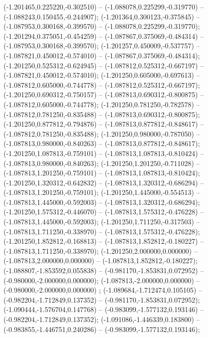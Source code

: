  (-1.201465,0.225220,-0.302510) -- (-1.088078,0.225299,-0.319770) -- (-1.088243,0.150455,-0.244907);
 (-1.201364,0.300123,-0.375845) -- (-1.087953,0.300168,-0.399570) -- (-1.088078,0.225299,-0.319770);
 (-1.201294,0.375051,-0.454259) -- (-1.087867,0.375069,-0.484314) -- (-1.087953,0.300168,-0.399570);
 (-1.201257,0.450009,-0.537757) -- (-1.087821,0.450012,-0.574010) -- (-1.087867,0.375069,-0.484314);
 (-1.201250,0.525312,-0.624945) -- (-1.087812,0.525312,-0.667197) -- (-1.087821,0.450012,-0.574010);
 (-1.201250,0.605000,-0.697613) -- (-1.087812,0.605000,-0.744778) -- (-1.087812,0.525312,-0.667197);
 (-1.201250,0.690312,-0.750157) -- (-1.087813,0.690312,-0.800875) -- (-1.087812,0.605000,-0.744778);
 (-1.201250,0.781250,-0.782578) -- (-1.087812,0.781250,-0.835488) -- (-1.087813,0.690312,-0.800875);
 (-1.201250,0.877812,-0.794876) -- (-1.087813,0.877812,-0.848617) -- (-1.087812,0.781250,-0.835488);
 (-1.201250,0.980000,-0.787050) -- (-1.087813,0.980000,-0.840263) -- (-1.087813,0.877812,-0.848617);
 (-1.201250,1.087813,-0.759101) -- (-1.087813,1.087813,-0.810424) -- (-1.087813,0.980000,-0.840263);
 (-1.201250,1.201250,-0.711028) -- (-1.087813,1.201250,-0.759101) -- (-1.087813,1.087813,-0.810424);
 (-1.201250,1.320312,-0.642832) -- (-1.087813,1.320312,-0.686294) -- (-1.087813,1.201250,-0.759101);
 (-1.201250,1.445000,-0.554513) -- (-1.087813,1.445000,-0.592003) -- (-1.087813,1.320312,-0.686294);
 (-1.201250,1.575312,-0.446070) -- (-1.087813,1.575312,-0.476228) -- (-1.087813,1.445000,-0.592003);
 (-1.201250,1.711250,-0.317503) -- (-1.087813,1.711250,-0.338970) -- (-1.087813,1.575312,-0.476228);
 (-1.201250,1.852812,-0.168813) -- (-1.087813,1.852812,-0.180227) -- (-1.087813,1.711250,-0.338970);
 (-1.201250,2.000000,0.000000) -- (-1.087813,2.000000,0.000000) -- (-1.087813,1.852812,-0.180227);
 (-1.088807,-1.853592,0.055838) -- (-0.981170,-1.853831,0.072952) -- (-0.980000,-2.000000,0.000000);
 (-1.087813,-2.000000,0.000000) -- (-0.980000,-2.000000,0.000000) ;
 (-1.089684,-1.712474,0.105105) -- (-0.982204,-1.712849,0.137352) -- (-0.981170,-1.853831,0.072952);
 (-1.090444,-1.576704,0.147768) -- (-0.983099,-1.577132,0.193146) -- (-0.982204,-1.712849,0.137352);
 (-1.091086,-1.446339,0.183800) -- (-0.983855,-1.446751,0.240286) -- (-0.983099,-1.577132,0.193146);
